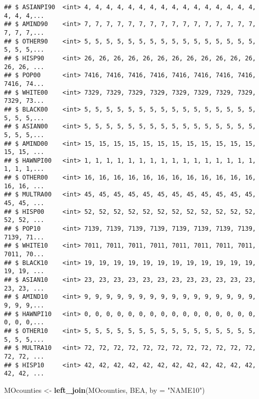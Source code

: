 \documentclass[]{book}
\newenvironment{Shaded}{\begin{snugshade}}{\end{snugshade}}
\newcommand{\DataTypeTok}[1]{\textcolor[rgb]{0.13,0.29,0.53}{#1}}
\newcommand{\KeywordTok}[1]{\textcolor[rgb]{0.13,0.29,0.53}{\textbf{#1}}}
\newcommand{\NormalTok}[1]{#1}
\newcommand{\StringTok}[1]{\textcolor[rgb]{0.31,0.60,0.02}{#1}}
\begin{document}
\begin{verbatim}
## $ ASIANPI90  <int> 4, 4, 4, 4, 4, 4, 4, 4, 4, 4, 4, 4, 4, 4, 4, 4, 4, 4, 4,...
## $ AMIND90    <int> 7, 7, 7, 7, 7, 7, 7, 7, 7, 7, 7, 7, 7, 7, 7, 7, 7, 7, 7,...
## $ OTHER90    <int> 5, 5, 5, 5, 5, 5, 5, 5, 5, 5, 5, 5, 5, 5, 5, 5, 5, 5, 5,...
## $ HISP90     <int> 26, 26, 26, 26, 26, 26, 26, 26, 26, 26, 26, 26, 26, 26, ...
## $ POP00      <int> 7416, 7416, 7416, 7416, 7416, 7416, 7416, 7416, 7416, 74...
## $ WHITE00    <int> 7329, 7329, 7329, 7329, 7329, 7329, 7329, 7329, 7329, 73...
## $ BLACK00    <int> 5, 5, 5, 5, 5, 5, 5, 5, 5, 5, 5, 5, 5, 5, 5, 5, 5, 5, 5,...
## $ ASIAN00    <int> 5, 5, 5, 5, 5, 5, 5, 5, 5, 5, 5, 5, 5, 5, 5, 5, 5, 5, 5,...
## $ AMIND00    <int> 15, 15, 15, 15, 15, 15, 15, 15, 15, 15, 15, 15, 15, 15, ...
## $ HAWNPI00   <int> 1, 1, 1, 1, 1, 1, 1, 1, 1, 1, 1, 1, 1, 1, 1, 1, 1, 1, 1,...
## $ OTHER00    <int> 16, 16, 16, 16, 16, 16, 16, 16, 16, 16, 16, 16, 16, 16, ...
## $ MULTRA00   <int> 45, 45, 45, 45, 45, 45, 45, 45, 45, 45, 45, 45, 45, 45, ...
## $ HISP00     <int> 52, 52, 52, 52, 52, 52, 52, 52, 52, 52, 52, 52, 52, 52, ...
## $ POP10      <int> 7139, 7139, 7139, 7139, 7139, 7139, 7139, 7139, 7139, 71...
## $ WHITE10    <int> 7011, 7011, 7011, 7011, 7011, 7011, 7011, 7011, 7011, 70...
## $ BLACK10    <int> 19, 19, 19, 19, 19, 19, 19, 19, 19, 19, 19, 19, 19, 19, ...
## $ ASIAN10    <int> 23, 23, 23, 23, 23, 23, 23, 23, 23, 23, 23, 23, 23, 23, ...
## $ AMIND10    <int> 9, 9, 9, 9, 9, 9, 9, 9, 9, 9, 9, 9, 9, 9, 9, 9, 9, 9, 9,...
## $ HAWNPI10   <int> 0, 0, 0, 0, 0, 0, 0, 0, 0, 0, 0, 0, 0, 0, 0, 0, 0, 0, 0,...
## $ OTHER10    <int> 5, 5, 5, 5, 5, 5, 5, 5, 5, 5, 5, 5, 5, 5, 5, 5, 5, 5, 5,...
## $ MULTRA10   <int> 72, 72, 72, 72, 72, 72, 72, 72, 72, 72, 72, 72, 72, 72, ...
## $ HISP10     <int> 42, 42, 42, 42, 42, 42, 42, 42, 42, 42, 42, 42, 42, 42, ...
\end{verbatim}

\begin{Shaded}
\begin{Highlighting}[]
\NormalTok{MOcounties <-}\StringTok{ }\KeywordTok{left_join}\NormalTok{(MOcounties, BEA, }\DataTypeTok{by =} \StringTok{"NAME10"}\NormalTok{)}
\end{Highlighting}
\end{Shaded}
\end{document}
